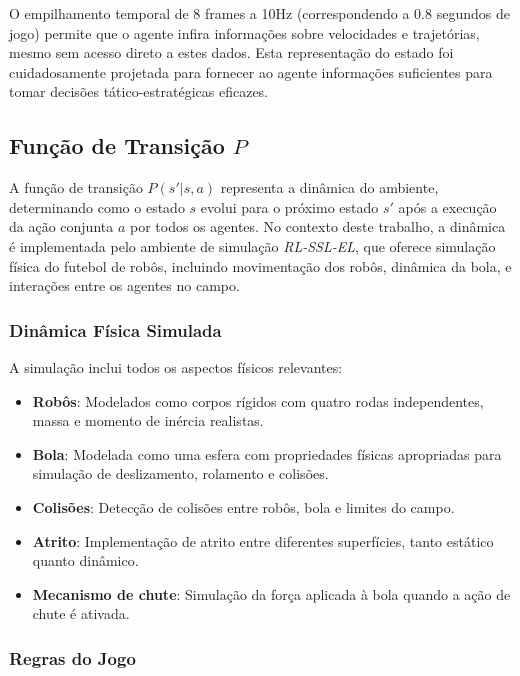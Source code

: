 O empilhamento temporal de 8 frames a 10Hz (correspondendo a 0.8 segundos de jogo) permite que o agente infira informações sobre velocidades e trajetórias, mesmo sem acesso direto a estes dados. Esta representação do estado foi cuidadosamente projetada para fornecer ao agente informações suficientes para tomar decisões tático-estratégicas eficazes.

\subsection{Função de Transição $P$}

A função de transição $P(s' | s, a)$ representa a dinâmica do ambiente, determinando como o estado $s$ evolui para o próximo estado $s'$ após a execução da ação conjunta $a$ por todos os agentes. No contexto deste trabalho, a dinâmica é implementada pelo ambiente de simulação \textit{RL-SSL-EL}, que oferece simulação física do futebol de robôs, incluindo movimentação dos robôs, dinâmica da bola, e interações entre os agentes no campo.

\subsubsection{Dinâmica Física Simulada}

A simulação inclui todos os aspectos físicos relevantes:

\begin{itemize}
    \item \textbf{Robôs}: Modelados como corpos rígidos com quatro rodas independentes, massa e momento de inércia realistas.
    \item \textbf{Bola}: Modelada como uma esfera com propriedades físicas apropriadas para simulação de deslizamento, rolamento e colisões.
    \item \textbf{Colisões}: Detecção de colisões entre robôs, bola e limites do campo.
    \item \textbf{Atrito}: Implementação de atrito entre diferentes superfícies, tanto estático quanto dinâmico.
    \item \textbf{Mecanismo de chute}: Simulação da força aplicada à bola quando a ação de chute é ativada.
\end{itemize}

\subsubsection{Regras do Jogo}

